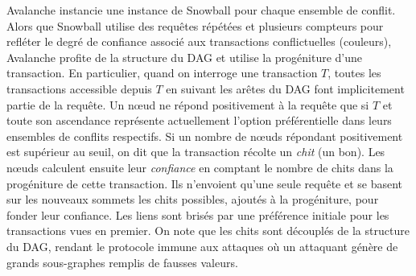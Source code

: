 %    

Avalanche instancie une instance de Snowball pour chaque ensemble de conflit.
Alors que Snowball utilise des requêtes répétées et plusieurs compteurs pour refléter le degré de confiance associé aux transactions conflictuelles (couleurs),
Avalanche profite de la structure du DAG et utilise la progéniture d'une transaction.
En particulier, quand on interroge une transaction $T$, toutes les transactions accessible depuis $T$ en suivant les arêtes du DAG font implicitement partie de la requête.
Un nœud ne répond positivement à la requête que si $T$ et toute son ascendance représente actuellement l'option préférentielle dans leurs ensembles de conflits respectifs.
Si un nombre de nœuds répondant positivement est supérieur au seuil, on dit que la transaction récolte un \emph{chit} (un bon).
Les nœuds calculent ensuite leur \emph{confiance} en comptant le nombre de chits dans la progéniture de cette transaction.
Ils n'envoient qu'une seule requête et se basent sur les nouveaux sommets les chits possibles, ajoutés à la progéniture, pour fonder leur confiance.
Les liens sont brisés par une préférence initiale pour les transactions vues en premier.
On note que les chits sont découplés de la structure du DAG, rendant le protocole immune aux attaques où un attaquant génère de grands sous-graphes remplis de fausses valeurs.

